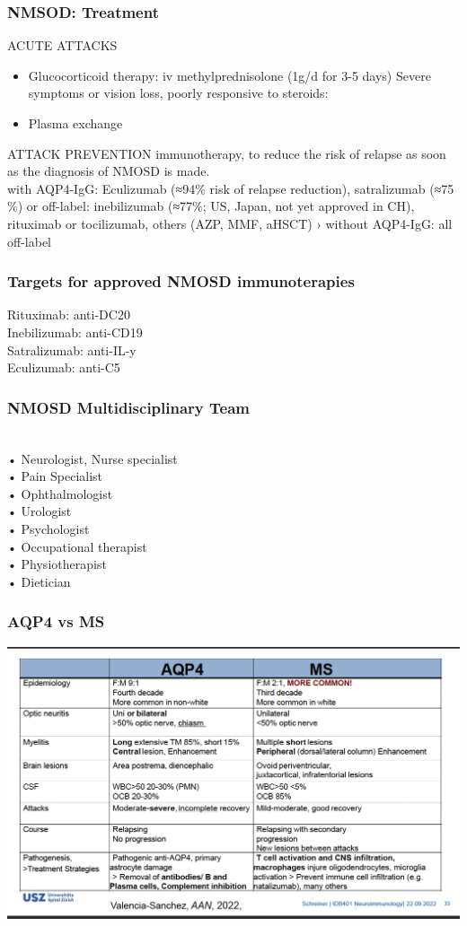 \begin{itemize}
\begin{itemize}
\subsubsection{NMSOD: Treatment}
ACUTE ATTACKS
\begin{itemize}
    \item  Glucocorticoid therapy: iv methylprednisolone (1g/d for 3-5 days)
Severe symptoms or vision loss, poorly responsive to steroids:
\item Plasma exchange
\end{itemize}
 ATTACK PREVENTION
immunotherapy, to reduce the risk of relapse as soon as the
diagnosis of NMOSD is made.
\\with AQP4-IgG: Eculizumab (≈94$\%$ risk of relapse reduction), satralizumab
(≈75$\%$) or off-label: inebilizumab (≈77$\%$; US, Japan, not yet approved in CH),
rituximab or tocilizumab, others (AZP, MMF, aHSCT)
› without AQP4-IgG: all off-label

\subsubsection{Targets for approved NMOSD immunoterapies}
Rituximab: anti-DC20
\\Inebilizumab: anti-CD19
\\Satralizumab: anti-IL-y
\\Eculizumab: anti-C5

\subsubsection{NMOSD Multidisciplinary Team}
\\• Neurologist, Nurse specialist
\\• Pain Specialist
\\• Ophthalmologist
\\• Urologist
\\• Psychologist
\\• Occupational therapist
\\• Physiotherapist
\\• Dietician

\subsubsection{AQP4 vs MS}
\includegraphics[width=1\textwidth]{Images/AQP4 vs MS.png}\\[1cm]


\end{itemize}
\end{itemize}
